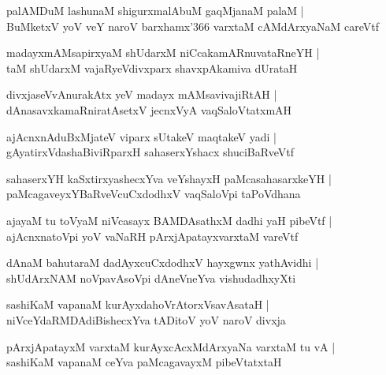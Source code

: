 \begin{shloka}
palAMDuM lashunaM shigurxmalAbuM gaqMjanaM palaM |\\
BuMketxV yoV veY naroV barxhamx\char'366 varxtaM cAMdArxyaNaM careVtf 
\end{shloka}

\begin{shloka}
madayxmAMsapirxyaM shUdarxM niCcakamARnuvataRneYH |\\
taM shUdarxM vajaRyeVdivxparx shavxpAkamiva dUrataH
\end{shloka}

\begin{shloka}
divxjaseVvAnurakAtx yeV madayx mAMsavivajiRtAH |\\
dAnasavxkamaRniratAsetxV jecnxVyA vaqSaloVtatxmAH
\end{shloka}

\begin{shloka}
ajAcnxnAduBxMjateV viparx sUtakeV maqtakeV yadi |\\
gAyatirxVdashaBiviRparxH sahaserxYshacx shuciBaRveVtf
\end{shloka}

\begin{shloka}
sahaserxYH kaSxtirxyashecxYva veYshayxH paMcasahasarxkeYH |\\
paMcagaveyxYBaRveVcuCxdodhxV vaqSaloVpi taPoVdhana
\end{shloka}

\begin{shloka}
ajayaM tu toVyaM niVcasayx BAMDAsathxM dadhi yaH pibeVtf |\\
ajAcnxnatoVpi yoV vaNaRH pArxjApatayxvarxtaM vareVtf
\end{shloka}

\begin{shloka}
dAnaM bahutaraM dadAyxcuCxdodhxV hayxgwnx yathAvidhi |\\
shUdArxNAM noVpavAsoVpi dAneVneYva vishudadhxyXti
\end{shloka}

\begin{shloka}
sashiKaM vapanaM kurAyxdahoVrAtorxVsavAsataH |\\
niVceYdaRMDAdiBishecxYva tADitoV yoV naroV divxja
\end{shloka}

\begin{shloka}
pArxjApatayxM varxtaM kurAyxcAcxMdArxyaNa varxtaM tu vA |\\
sashiKaM vapanaM ceYva paMcagavayxM pibeVtatxtaH 
\end{shloka}

